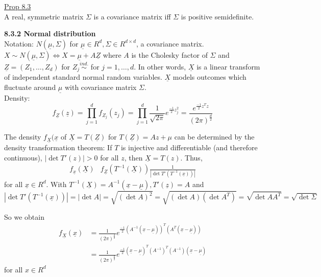 \documentclass[10pt,letterpaper]{article}
\begin{document}
\underline{Prop 8.3}\\

				A real, symmetric matrix $\Sigma$ is a covariance matrix iff $\Sigma$ is positive semidefinite.

\pagebreak

\textbf{8.3.2 Normal distribution}\\

						Notation: $N(\underline{\mu}, \Sigma)$ for $\underline{\mu}\in R^d, \Sigma\in R^{d\times d}$, a covariance matrix.\\
						
						$X\sim N(\underline{\mu}, \Sigma)\Leftrightarrow X=\underline{\mu}+A\underline{Z}$ where $A$ is the Cholesky factor of $\Sigma$ and $\underline{Z}=(Z_1, \dots, Z_d)$ for $Z_j\stackrel{ind.}{\sim}$ for $j=1, \dots, d$. In other words, $\underline{X}$ is a linear transform of independent standard normal random variables. $\underline{X}$ models outcomes which fluctuate around $\underline{\mu}$ with covariance matrix $\Sigma$.\\
						
						Density:
							$$f_{\underline{Z}}(\underline{z})=\prod_{j=1}^df_{Z_j}(z_j)
							=\prod_{j=1}^d\frac{1}{\sqrt{2\pi}}e^{\frac{-1}{2}z_j^2}
							=\frac{e^{\frac{-1}{2}z^Tz}}{(2\pi)^{\frac{d}{2}}}$$
						
						The density $f_{\underline{X}}(\underline{x}$ of $\underline{X}=T(\underline{Z})$ for $T(\underline{Z})=Az+\mu$ can be determined by the density transformation theorem: If $T$ is injective and differentiable (and therefore continuous), $|\det T'(z)|>0$ for all $z$, then $\underline{X}=T(z)$. Thus,
						\begin{align*}
							f_{\underline{x}}(\underline{X})&f_{\underline{Z}}(T^{-1}(\underline{X}))\frac{1}{|\det T'(T^{-1}(\underline{x}))|}
						\end{align*}
						for all $\underline{x}\in R^d$. With $T^{-1}(\underline{X})=A^{-1}(\underline{x}-\underline{\mu}), T'(\underline{z})=A$ and
						$$|\det T'(T^{-1}(\underline{x}))|=|\det A|
							=\sqrt{(\det A)^2}
							=\sqrt{(\det A)(\det A^T)}
							=\sqrt{\det AA^T}
							=\sqrt{\det \Sigma}$$
						
						So we obtain
						\begin{align*}
							f_{\underline{X}}(\underline{x})&=\frac{1}{(2\pi)^{\frac{d}{2}}}e^{\frac{-1}{2}(A^{-1}(\underline{x}-\underline{\mu}))^T(A^T(\underline{x}-\underline{\mu}))}\\
							&=\frac{1}{(2\pi)^{\frac{d}{2}}}e^{\frac{-1}{2}(\underline{x}-\underline{\mu})^T(A^{-1})^T(A^{-1})(\underline{x}-\underline{\mu})}
						\end{align*}
							for all $x\in R^d$\\
							
\end{document}
